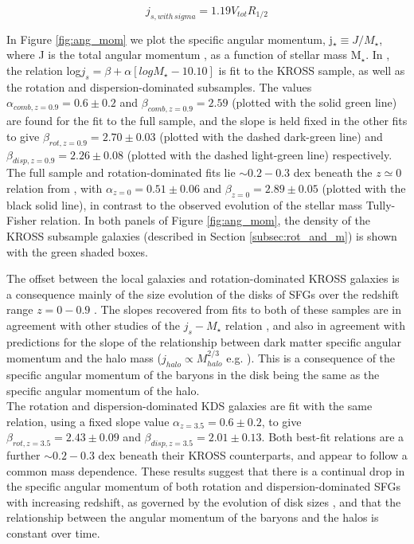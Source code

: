 \documentclass[fleqn,usenatbib]{mnras}
\begin{document}
\begin{equation}\label{eq:ang_mom_final}
  j_{s,with\,sigma} = 1.19V_{tot}R_{1/2}
\end{equation}

\noindent
In Figure \ref{fig:ang_mom} we plot the specific angular momentum, j$_{\star} \equiv J/M_{\star}$, where J is the total angular momentum \citep{Fall1983}, as a function of stellar mass M$_{\star}$.
In \cite{Harrison2017}, the relation log$j_{s} =  \beta + \alpha[logM_{\star} - 10.10]$ is fit to the KROSS sample, as well as the rotation and dispersion-dominated subsamples.
The values $\alpha_{comb,z=0.9}=0.6\pm0.2$ and $\beta_{comb,z=0.9}=2.59$ (plotted with the solid green line) are found for the fit to the full sample, and the slope is held fixed in the other fits to give $\beta_{rot,z=0.9}=2.70\pm0.03$ (plotted with the dashed dark-green line) and $\beta_{disp,z=0.9}=2.26\pm0.08$ (plotted with the dashed light-green line) respectively.  
The full sample and rotation-dominated fits lie $\sim0.2-0.3$ dex beneath the $z\simeq0$ relation from \cite{Romanowsky2012}, with $\alpha_{z=0}=0.51\pm0.06$ and $\beta_{z=0}=2.89\pm0.05$ (plotted with the black solid line), in contrast to the observed evolution of the stellar mass Tully-Fisher relation.
In both panels of Figure \ref{fig:ang_mom}, the density of the KROSS subsample galaxies (described in Section \ref{subsec:rot_and_m}) is shown with the green shaded boxes.

The offset between the local galaxies and rotation-dominated KROSS galaxies is a consequence mainly of the size evolution of the disks of SFGs over the redshift range $z=0-0.9$ \citep[e.g.][]{Trujillo2007,VanderWel2014a}.
The slopes recovered from fits to both of these samples are in agreement with other studies of the $j_{s}-M_{\star}$ relation \citep{Cortese2016,Contini2015a,Burkert2016a,Swinbank2017}, and also in agreement with predictions for the slope of the relationship between dark matter specific angular momentum and the halo mass ($j_{halo} \propto M_{halo}^{2/3}$ e.g. \citealt{Barnes1987}).
This is a consequence of the specific angular momentum of the baryons in the disk being the same as the specific angular momentum of the halo. \\


The rotation and dispersion-dominated KDS galaxies are fit with the same relation, using a fixed slope value $\alpha_{z=3.5} = 0.6\pm0.2$, to give $\beta_{rot,z=3.5}=2.43\pm0.09$ and $\beta_{disp,z=3.5}=2.01\pm0.13$.
Both best-fit relations are a further $\sim 0.2-0.3$ dex beneath their KROSS counterparts, and appear to follow a common mass dependence.
These results suggest that there is a continual drop in the specific angular momentum of both rotation and dispersion-dominated SFGs with increasing redshift, as governed by the evolution of disk sizes \citep[e.g.][]{Trujillo2007}, and that the relationship between the angular momentum of the baryons and the halos is constant over time.
\end{document}
